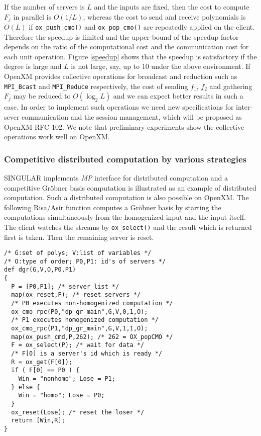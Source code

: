 If the number of servers is $L$ and the inputs are fixed, then the cost to
compute $F_j$ in parallel is $O(1/L)$, whereas the cost
to send and receive polynomials is $O(L)$ if {\tt ox\_push\_cmo()} and
{\tt ox\_pop\_cmo()} are repeatedly applied on the client.
Therefore the speedup is limited and the upper bound of
the speedup factor depends on the ratio of 
the computational cost and the communication cost for each unit operation.
Figure \ref{speedup} shows that 
the speedup is satisfactory if the degree is large and $L$
is not large, say, up to 10 under the above environment.
If OpenXM provides collective operations for broadcast and reduction
such as {\tt MPI\_Bcast} and {\tt MPI\_Reduce} respectively, the cost of 
sending $f_1$, $f_2$ and gathering $F_j$ may be reduced to $O(\log_2L)$
and we can expect better results in such a case. In order to implement
such operations we need new specifications for inter-sever communication
and the session management, which will be proposed as OpenXM-RFC 102.
We note that preliminary experiments show the collective operations
work well on OpenXM.

\subsubsection{Competitive distributed computation by various strategies}

SINGULAR \cite{Singular} implements {\it MP} interface for distributed
computation and a competitive Gr\"obner basis computation is
illustrated as an example of distributed computation.
Such a distributed computation is also possible on OpenXM.
The following Risa/Asir function computes a Gr\"obner basis by
starting the computations simultaneously from the homogenized input and
the input itself.  The client watches the streams by {\tt ox\_select()}
and the result which is returned first is taken. Then the remaining
server is reset.

\begin{verbatim}
/* G:set of polys; V:list of variables */
/* O:type of order; P0,P1: id's of servers */
def dgr(G,V,O,P0,P1)
{
  P = [P0,P1]; /* server list */
  map(ox_reset,P); /* reset servers */
  /* P0 executes non-homogenized computation */
  ox_cmo_rpc(P0,"dp_gr_main",G,V,0,1,O);
  /* P1 executes homogenized computation */
  ox_cmo_rpc(P1,"dp_gr_main",G,V,1,1,O);
  map(ox_push_cmd,P,262); /* 262 = OX_popCMO */
  F = ox_select(P); /* wait for data */
  /* F[0] is a server's id which is ready */
  R = ox_get(F[0]);
  if ( F[0] == P0 ) {
    Win = "nonhomo"; Lose = P1;
  } else {
    Win = "homo"; Lose = P0;
  }
  ox_reset(Lose); /* reset the loser */
  return [Win,R];
}
\end{verbatim}

